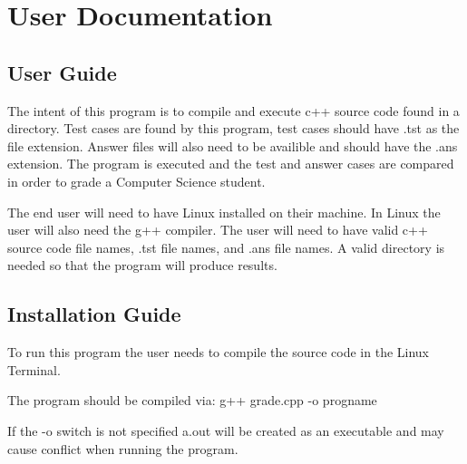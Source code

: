 
\chapter{User Documentation}


\section{User Guide}
The intent of this program is to compile and execute c++ source code found in a directory. Test cases are found by this program, test cases should have .tst as the file extension. Answer files will also need to be availible and should have the .ans extension. The program is executed and the test and answer cases are compared in order to grade a Computer Science student. 

The end user will need to have Linux installed on their machine. In Linux the user will also need the g++ compiler. The user will need to have valid c++ source code file names, .tst file names, and .ans file names. A valid directory is needed so that the program will produce results. 


\section{Installation Guide}
To run this program the user needs to compile the source code in the Linux Terminal. 

The program should be compiled via:
	g++ grade.cpp -o progname 

If the -o switch is not specified a.out will be created as an executable and may cause conflict when running the program. 

